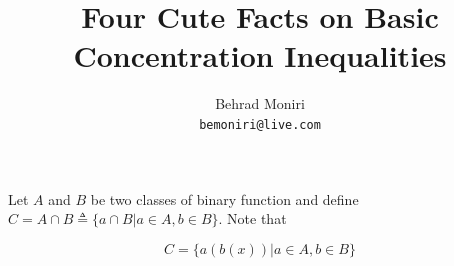 \documentclass[]{article}
\title{Four Cute Facts on Basic Concentration Inequalities}
\author{Behrad Moniri\\\texttt{bemoniri@live.com}}
\date{}
\begin{document}
\maketitle

Let $A$ and $B$ be two classes of binary function and define $C = A\cap B \triangleq \{a\cap B| a\in A, b \in B\}$. Note that 

\begin{equation}
	C = \{a(b(x)) | a\in A, b \in B\}
\end{equation}
\end{document}
